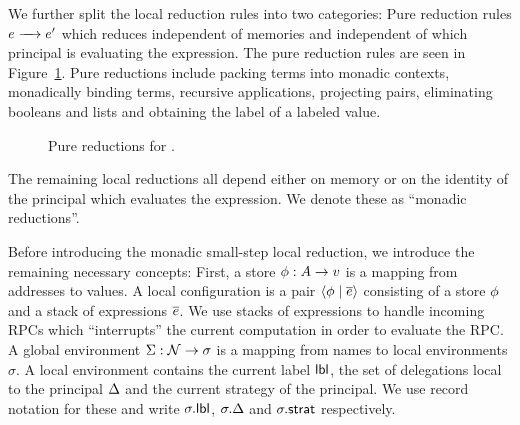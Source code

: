 We further split the local reduction rules into two categories: Pure reduction rules $\steppure{\expr}{\expr'}$ which reduces independent of memories and independent of which principal is evaluating the expression. The pure reduction rules are seen in Figure~\ref{fig:pure-reductions}. Pure reductions include packing terms into monadic contexts, monadically binding terms, recursive applications, projecting pairs, eliminating booleans and lists and obtaining the label of a labeled value.

\begin{figure}
    \centering
    \caption{Pure reductions for \lang.}
    \label{fig:pure-reductions}
\end{figure}

The remaining local reductions all depend either on memory or on the identity of the principal which evaluates the expression. We denote these as ``monadic reductions''.

Before introducing the monadic small-step local reduction, we introduce the remaining necessary concepts: First, a store $\phi: A \to v$ is a mapping from addresses to values. A local configuration is a pair $\langle \phi \mid \overline{e} \rangle$ consisting of a store $\phi$ and a stack of expressions $\overline{e}$. We use stacks of expressions to handle incoming RPCs which ``interrupts'' the current computation in order to evaluate the RPC. A global environment $\Sigma: \mathcal{N} \to \sigma$ is a mapping from names to local environments $\sigma$. A local environment contains the current label $\mathsf{lbl}$, the set of delegations local to the principal $\Delta$ and the current strategy of the principal. We use record notation for these and write $\sigma.\mathsf{lbl}$, $\sigma.\Delta$ and $\sigma.\mathsf{strat}$ respectively.

